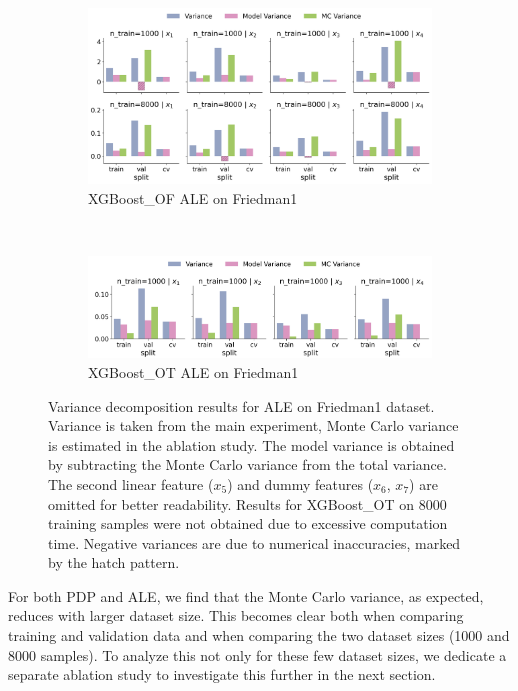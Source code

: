 \documentclass[runningheads]{llncs}
\begin{document}
\begin{figure}[htbp]
    \centering
    \begin{subfigure}[b]{0.75\textwidth}
        \includegraphics[width=\textwidth]{img/variance_decomposition_ale_XGBoost_OF.png}
        \caption{XGBoost\_OF ALE on Friedman1}
    \end{subfigure}
    \\[10pt]
    \vfill
    \begin{subfigure}[b]{0.75\textwidth}
        \includegraphics[width=\textwidth]{img/variance_decomposition_ale_XGBoost_OT.png}
        \caption{XGBoost\_OT ALE on Friedman1}
    \end{subfigure}
    \caption{Variance decomposition results for ALE on Friedman1 dataset. Variance is taken from the
    main experiment, Monte Carlo variance is estimated in the ablation study. The model variance is
    obtained by subtracting the Monte Carlo variance from the total variance. The second linear feature
    ($x_5$) and dummy features ($x_6$, $x_7$) are omitted for better readability. Results for XGBoost\_OT
    on 8000 training samples were not obtained due to excessive computation time. Negative variances are
    due to numerical inaccuracies, marked by the hatch pattern.}
    \label{fig:ale-variance-decomp}  %
\end{figure}

For both PDP and ALE, we find that the Monte Carlo variance, as expected, reduces with larger dataset size.
This becomes clear both when comparing training and validation data and when comparing the two dataset sizes
(1000 and 8000 samples). To analyze this not only for these few dataset sizes, we dedicate a separate
ablation study to investigate this further in the next section.
\end{document}
